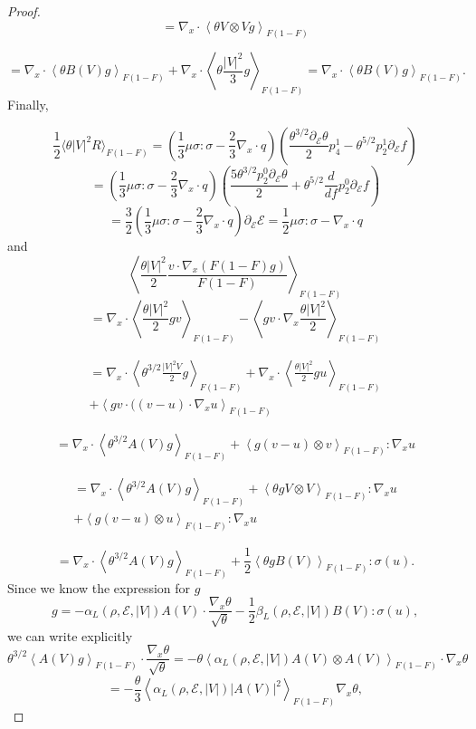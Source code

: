 \begin{proof}
\[=\nabla_x\cdot\left\langle  \theta V\otimes V  g \right\rangle_{F(1-F)}\]

\[=\nabla_x\cdot\left\langle  \theta B(V) g \right\rangle_{F(1-F)}+
\nabla_x\cdot\left\langle  \theta \frac{|V|^2}{3} g \right\rangle_{F(1-F)}=
\nabla_x\cdot\left\langle  \theta B(V) g \right\rangle_{F(1-F)}.\]
Finally,


\[\frac{1}{2}\langle \theta|V|^2 R\rangle_{F(1-F)}=\left(\frac {1}{3} \mu\sigma:\sigma-\frac
23 \nabla_x\cdot q\right)\left(\frac{ \theta^{3/2}\partial_{\mathcal
E}\theta}{2}p^1_4-\theta^{5/2}p^1_2\partial_{\mathcal E}f\right)\]
\[= \left(\frac {1}{3} \mu\sigma:\sigma-\frac
23 \nabla_x\cdot q\right)\left(\frac{5 \theta^{3/2}p^0_2\partial_{\mathcal
E}\theta }{2}+\theta^{5/2}\frac{d}{df}p^0_2\partial_{\mathcal E}f\right)\]
\[=\frac{3}{2}\left(\frac {1}{3} \mu\sigma:\sigma-\frac
23 \nabla_x\cdot q\right)\partial_{\mathcal E}{\mathcal E}
=  \frac {1}{2} \mu\sigma:\sigma-  \nabla_x\cdot q  \]
and
\[\left\langle   \frac{\theta |V|^2}{2}\frac{  v\cdot\nabla_x (F(1-F)g)}{F(1-F)} 
 \right\rangle_{F(1-F)}\]
\[=\nabla_x\cdot \left\langle   \frac{\theta |V|^2}{2}gv \right\rangle_{F(1-F)}
-\left\langle   gv\cdot\nabla_x\frac{\theta |V|^2}{2}  \right\rangle_{F(1-F)}\]

\[\begin{split}=\nabla_x\cdot \left\langle   \theta^{3/2}\frac{ |V|^2V}{2}g  
\right\rangle_{F(1-F)}+
\nabla_x\cdot \left\langle   \frac{\theta |V|^2}{2}gu \right\rangle_{F(1-F)}
\\+\left\langle   gv\cdot ((v-u) \cdot \nabla_x u 
\right\rangle_{F(1-F)}\end{split} \]

\[=\nabla_x\cdot \left\langle   \theta^{3/2}A(V)g  \right\rangle_{F(1-F)}+
\left\langle   g(v-u)\otimes v \right\rangle_{F(1-F)}: \nabla_x u\]

\[\begin{split}=\nabla_x\cdot \left\langle   \theta^{3/2}A(V)g  
\right\rangle_{F(1-F)}+
\left\langle \theta  g V\otimes V \right\rangle_{F(1-F)}: \nabla_x u\\+
\left\langle   g(v-u)\otimes u \right\rangle_{F(1-F)}: \nabla_x u\end{split}\]

\[=\nabla_x\cdot \left\langle   \theta^{3/2}A(V)g  
\right\rangle_{F(1-F)}+\frac{1}{2}
\left\langle \theta  g B(V) \right\rangle_{F(1-F)}: \sigma(u).\]
Since we know the expression for $g$
\[g = -\alpha_L(\rho,\mathcal E,|V|)A(V)\cdot \frac{\nabla_x\theta}{\sqrt\theta}
-\frac 12\beta_L(\rho,\mathcal E,|V|)B(V):\sigma(u),\]we can write explicitly
\[\theta^{3/2} \left\langle A(V)g  \right\rangle_{F(1-F)}\cdot 
\frac{\nabla_x\theta}{\sqrt\theta}=
-\theta \left\langle \alpha_L(\rho,\mathcal E,|V|) A(V) \otimes A(V) 
\right\rangle_{F(1-F)} \cdot   \nabla_x\theta 
\]\[= -\frac{\theta}{3} \left\langle \alpha_L(\rho,\mathcal E,|V|) |A(V)|^2 
\right\rangle_{F(1-F)}   \nabla_x\theta, \]


\end{proof}
